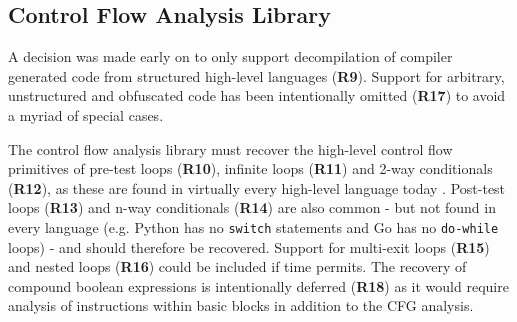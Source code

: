 
\subsection{Control Flow Analysis Library}

A decision was made early on to only support decompilation of compiler generated code from structured high-level languages (\textbf{R9}). Support for arbitrary, unstructured and obfuscated code has been intentionally omitted (\textbf{R17}) to avoid a myriad of special cases.

The control flow analysis library must recover the high-level control flow primitives of pre-test loops (\textbf{R10}), infinite loops (\textbf{R11}) and 2-way conditionals (\textbf{R12}), as these are found in virtually every high-level language today \cite{reverse_comp}. Post-test loops (\textbf{R13}) and n-way conditionals (\textbf{R14}) are also common - but not found in every language (e.g. Python has no \texttt{switch} statements and Go has no \texttt{do-while} loops) - and should therefore be recovered. Support for multi-exit loops (\textbf{R15}) and nested loops (\textbf{R16}) could be included if time permits. The recovery of compound boolean expressions is intentionally deferred (\textbf{R18}) as it would require analysis of instructions within basic blocks in addition to the CFG analysis.

